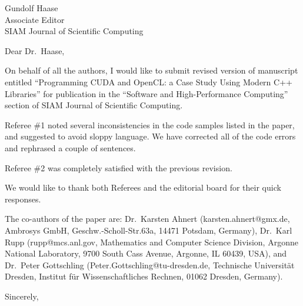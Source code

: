 \documentclass[a4paper,11pt]{letter}
\begin{document}
\begin{letter}{
    Gundolf Haase\\
    Associate Editor\\
    SIAM Journal of Scientific Computing
    }
\opening{Dear Dr.~Haase,}

On behalf of all the authors, I would like to submit revised version of
manuscript entitled ``Programming CUDA and OpenCL: a Case Study Using Modern
C++ Libraries'' for publication in the ``Software and High-Performance
Computing'' section of SIAM Journal of Scientific Computing.

Referee \#1 noted several inconsistencies in the code samples listed in the
paper, and suggested to avoid sloppy language. We have corrected all of the
code errors and rephrased a couple of sentences.

Referee \#2 was completely satisfied with the previous revision.

We would like to thank both Referees and the editorial board for their quick
responses.

The co-authors of the paper are: Dr.~Karsten Ahnert (karsten.ahnert@gmx.de,
Ambrosys GmbH, Geschw.-Scholl-Str.63a, 14471 Potsdam, Germany), Dr.~Karl Rupp
(rupp@mcs.anl.gov, Mathematics and Computer Science Division, Argonne National
Laboratory, 9700 South Cass Avenue, Argonne, IL 60439, USA), and Dr.~Peter
Gottschling (Peter.Gottschling@tu-dresden.de, Technische Universit\"at Dresden,
Institut f\"ur Wissenschaftliches Rechnen, 01062 Dresden, Germany).

\closing{Sincerely,}

\end{letter}
\end{document}
